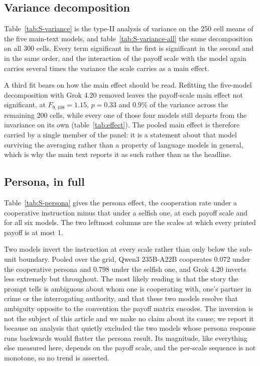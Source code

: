 \documentclass[openacc]{rsproca_new}
\begin{document}
\subsection{Variance decomposition}\label{appendix:variance}

Table~\ref{tab:S-variance} is the type-II analysis of variance on the 250 cell
means of the five main-text models, and table~\ref{tab:S-variance-all} the same
decomposition on all 300 cells. Every term significant in the first is
significant in the second and in the same order, and the interaction of the
payoff scale with the model again carries several times the variance the scale
carries as a main effect.

A third fit bears on how the main effect should be read. Refitting the
five-model decomposition with Grok 4.20 removed leaves the payoff-scale main
effect not significant, at $F_{9,108} = 1.15$, $p = 0.33$ and $0.9\%$ of the
variance across the remaining 200 cells, while every one of those four models
still departs from the invariance on its own (table~\ref{tab:effect}). The
pooled main effect is
therefore carried by a single member of the panel: it is a statement about that
model surviving the averaging rather than a property of language models in
general, which is why the main text reports it as such rather than as the
headline.

\subsection{Persona, in full}\label{appendix:persona_full}

Table~\ref{tab:S-persona} gives the persona effect, the cooperation rate under
a cooperative instruction minus that under a selfish one, at each payoff scale
and for all six models. The two leftmost columns are the scales at which every
printed payoff is at most 1.

Two models invert the instruction at every scale rather than only below the
sub-unit boundary. Pooled over the grid, Qwen3 235B-A22B cooperates 0.072 under
the cooperative persona and 0.798 under the selfish one, and Grok 4.20 inverts
less extremely but throughout. The most likely reading is that the story the
prompt tells is ambiguous about whom one is cooperating with, one's partner in
crime or the interrogating authority, and that these two models resolve that
ambiguity opposite to the convention the payoff matrix encodes. The inversion
is not the subject of this article and we make no claim about its cause; we
report it because an analysis that quietly excluded the two models whose
persona response runs backwards would flatter the persona result. Its
magnitude, like everything else measured here, depends on the payoff scale, and
the per-scale sequence is not monotone, so no trend is asserted.
\end{document}
